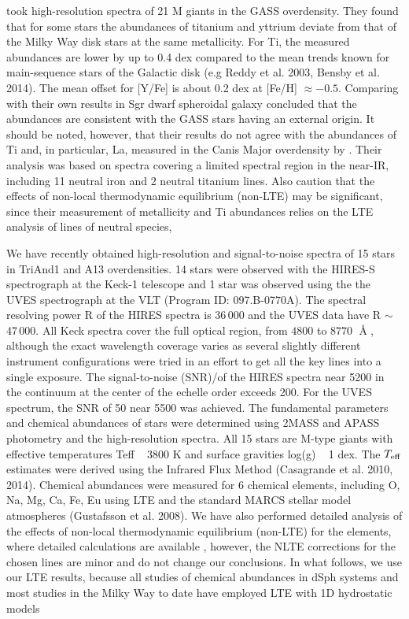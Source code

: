 \documentclass[galaxies,article,submit,moreauthors,pdftex,10pt,a4paper]{mdpi}
\begin{document}
\cite{chou2010b} took high-resolution spectra of 21 M giants in the GASS overdensity. They found that for some stars the abundances of titanium and yttrium deviate from that of the Milky Way disk stars at the same metallicity.  For Ti, the measured abundances are lower by up to 0.4 dex compared to the mean trends known for main-sequence stars of the Galactic disk (e.g Reddy et al. 2003, Bensby et al. 2014). The mean offset for [Y/Fe] is about 0.2 dex at [Fe/H] $\approx -0.5$. Comparing with their own results in Sgr dwarf spheroidal galaxy \citep{chou2010a} concluded that the abundances are consistent with the GASS stars having an external origin. It should be noted, however, that their results do not agree with the abundances of Ti and, in particular, La, measured in the Canis Major overdensity by \cite{sbordone2005}. Their analysis was based on spectra covering a limited spectral region in the near-IR, including 11 neutral iron and 2 neutral titanium lines. Also \cite{chou2010b} caution that the effects of non-local thermodynamic equilibrium (non-LTE) may be significant, since their measurement of metallicity and Ti abundances relies on the LTE analysis of lines of neutral species,

We have recently obtained high-resolution and signal-to-noise spectra of 15 stars in TriAnd1 and A13 overdensities. 14 stars were observed with the HIRES-S spectrograph at the Keck-1 telescope \cite{vogt1994} and 1 star was observed using the the UVES spectrograph at the VLT (Program ID: 097.B-0770A). The spectral resolving power R of the HIRES spectra is 36\,000 and the UVES data have R $\sim$ 47\,000. All Keck spectra cover the full optical region, from $4800$ to $8770$ $\Angstrom$, although the exact wavelength coverage varies as several slightly different instrument configurations were tried in an effort to get all the key lines into a single exposure. The signal-to-noise (SNR)/\Angstrom of the HIRES spectra near 5200 \Angstrom in the continuum at the center of the echelle order exceeds 200. For the UVES spectrum, the SNR of 50 near 5500 \Angstrom was achieved. The fundamental parameters and chemical abundances of stars were determined using 2MASS and APASS photometry and the high-resolution spectra. All 15 stars are M-type giants with effective temperatures Teff ~ 3800 K and surface gravities log(g) ~ 1 dex. The $T_{\rm eff}$ estimates were derived using the Infrared Flux Method (Casagrande et al. 2010, 2014). Chemical abundances were measured for 6 chemical elements, including O, Na, Mg, Ca, Fe, Eu using LTE and the standard MARCS stellar model atmospheres (Gustafsson et al. 2008). We have also performed detailed analysis of the effects of non-local thermodynamic equilibrium (non-LTE) for the elements, where detailed calculations are available \cite{bergemann2011, bergemann2012, bergemann2016}, however, the NLTE corrections for the chosen lines are minor and do not change our conclusions. In what follows, we use our LTE results, because all studies of chemical abundances in dSph systems and most studies in the Milky Way to date have employed LTE with 1D hydrostatic models
\end{document}
